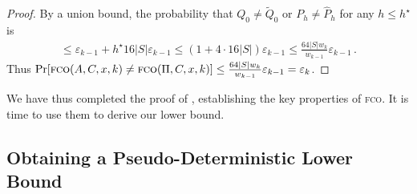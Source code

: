 \documentclass[10pt,a4paper]{article}
\theoremstyle{definition}
\theoremstyle{remark}
\newcommand{\tQ}{\widetilde{Q}}
\newcommand{\hP}{\hat{P}}
\let\epsilon\varepsilon
\newcommand{\fco}{\textsc{fco}\xspace}
\begin{document}
\begin{itemize}
\begin{itemize}
\begin{proof}
  By a union bound, the probability that $Q_0 \ne \tQ_0$ or $P_h \ne \hP_h$ for any $h \le h^\star$ is
  \begin{align*}
    \le \epsilon_{k-1} + h^\star 16 |S| \epsilon_{k-1} \le (1 + 4 \cdot 16 |S|) \epsilon_{k-1} \le \frac{64 |S| w_k}{w_{k-1}} \epsilon_{k-1} \,.
  \end{align*}
  Thus $\Pr[\fco(A, C, x, k) \ne \fco(\Pi, C, x, k)] \le \frac{64 |S| w_k}{w_{k-1}} \epsilon_{k-1} = \epsilon_k$.
\end{proof}

We have thus completed the proof of , establishing
the key properties of \fco. It is time to use them to derive our lower bound.

\subsection{Obtaining a Pseudo-Deterministic Lower Bound}


\end{itemize}
\end{itemize}
\end{document}
